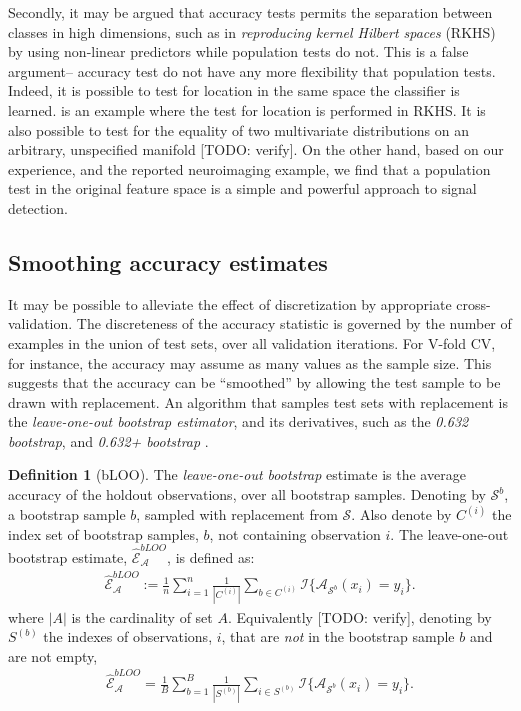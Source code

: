 \documentclass[12pt,a4paper]{article}
\theoremstyle{definition}
\newtheorem{definition}{Definition}
\newcommand{\set}[1]{\{ #1 \}} %
\newcommand{\indicator}[1]{\mathcal{I}{\set{#1}}} %
\newcommand{\features}{x} %
\newcommand{\outcomes}{y} %
\newcommand{\accEstim}{\hat{\mathcal{E}}}
\newcommand{\hypFun}[2]{\algo_{#1}(#2)} %
\newcommand{\algo}{\mathcal{A}}
\newcommand{\data}{\mathcal{S}}
\begin{document}
Secondly, it may be argued that accuracy tests permits the separation between classes in high dimensions, such as in \emph{reproducing kernel Hilbert spaces} (RKHS) by using non-linear predictors while population tests do not. 
This is a false argument-- accuracy test do not have any more flexibility that population tests. 
Indeed, it is possible to test for location in the same space the classifier is learned. 
\citet{gretton_kernel_2012-1} is an example where the test for location is performed in RKHS.
It is also possible to test for the equality of two multivariate distributions on an arbitrary, unspecified manifold \citep[e.g.][]{heller_consistent_2013}[TODO: verify].
On the other hand, based on our experience, and the reported neuroimaging example, we find that a population test in the original feature space is a simple and powerful approach to signal detection.










\subsection{Smoothing accuracy estimates}
\label{sec:bootstrap}
It may be possible to alleviate the effect of discretization by appropriate cross-validation. 
The discreteness of the accuracy statistic is governed by the number of examples in the union of test sets, over all validation iterations.
For V-fold CV, for instance, the accuracy may assume as many values as the sample size. 
This suggests that the accuracy can be ``smoothed'' by allowing the test sample to be drawn with replacement. 
An algorithm that samples test sets with replacement is the \emph{leave-one-out bootstrap estimator},  and its derivatives, such as the \emph{0.632 bootstrap}, and \emph{0.632+ bootstrap} \citep[Sec 7.11]{hastie_elements_2003}.
\begin{definition}[bLOO]
\label{def:bloo}
The \emph{leave-one-out bootstrap} estimate is the average accuracy of the holdout observations, over all bootstrap samples. 
Denoting by $\data^b$, a bootstrap sample $b$, sampled with replacement from $\data$. 
Also denote by $C^{(i)}$ the index set of bootstrap samples, $b$, not containing observation $i$.
The leave-one-out bootstrap estimate, $\accEstim_{\algo}^{bLOO}$,  is defined as:
\begin{align}
		\accEstim_{\algo}^{bLOO}:= \frac 1n \sum_{i=1}^{n} \frac{1}{|C^{(i)}|} \sum_{b \in C^{(i)}} \indicator{\hypFun{\data^b}{\features_i}=\outcomes_i}.
\end{align}
where $|A|$ is the cardinality of set $A$.
Equivalently [TODO: verify], denoting by $S^{(b)}$ the indexes of observations, $i$, that are \emph{not} in the bootstrap sample $b$ and are not empty, 
\begin{align}
	\accEstim_{\algo}^{bLOO} = \frac 1B \sum_{b=1}^{B} \frac{1}{|S^{(b)}|} \sum_{i \in S^{(b)}} \indicator{\hypFun{\data^b}{\features_i}=\outcomes_i}.
\end{align}
\end{definition}
\end{document}
